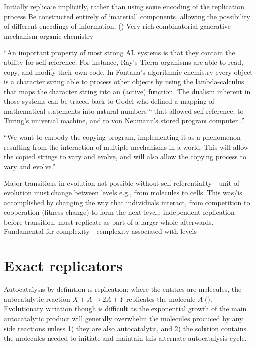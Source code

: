 \begin{DRAFT}
Initially replicate implicitly, rather than using some encoding of the replication process  \parencite{Taylor2001}
Be constructed entirely of `material' components, allowing the possibility of different encodings of information. ()
Very rich combinatorial generative mechanism \eg organic chemistry \parencite{Vasas2015}

``An important property of most strong AL systems is that they contain the ability for self-reference. For instance, Ray's Tierra organisms are able to read, copy, and modify their own code. In Fontana's algorithmic chemistry every object is a character string able to process other objects by using the lambda-calculus that maps the character string into an (active) function. The dualism inherent in those systems can be traced back to Godel who defined a mapping of mathematical statements into natural numbers `` that allowed self-reference, to Turing's universal machine, and to von Neumann's stored program computer .''\parencite{Dittrich1998}

``We want to embody the copying program, implementing it as a phenomenon resulting from the interaction of multiple mechanisms in a world. This will allow the copied strings to vary and evolve, and will also allow the copying process to vary and evolve.'' \textcite{Nellis2014}

Major transitions in evolution not possible without self-referentiality - unit of evolution must change between levels e.g., from molecules to cells. This was/is accomplished by changing the way that individuals interact, from competition to cooperation (fitness change) to form the next level,; independent replication before transition, must replicate as part of a larger whole afterwards. 
Fundamental for complexity - complexity associated with levels  \parencite{Watson2015}
\end{DRAFT}

\section{Exact replicators}\label{non-informational-exact-replicators}

Autocatalysis by definition is replication; where the entities are molecules, the autocatalytic reaction $X + A\rightarrow 2A + Y$ replicates the molecule $A$ (\eg \textcite{Lifson1997}). Evolutionary variation though is difficult as the exponential growth of the main autocatalytic product will generally overwhelm the molecules produced by any side reactions unless 1) they are also autocatalytic, and 2) the solution contains the molecules needed to initiate and maintain this alternate autocatalysis cycle.

